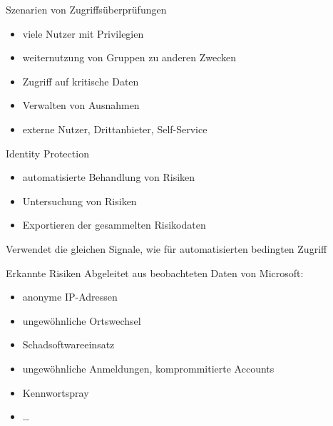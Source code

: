 \begin{flashcard}[Definition]{Szenarien von Zugriffsüberprüfungen}
  \begin{itemize}
    \item viele Nutzer mit Privilegien
    \item weiternutzung von Gruppen zu anderen Zwecken
    \item Zugriff auf kritische Daten
    \item Verwalten von Ausnahmen
    \item externe Nutzer, Drittanbieter, Self-Service
  \end{itemize}
\end{flashcard}

\begin{flashcard}[Definition]{Identity Protection}
  \begin{itemize}
    \item automatisierte Behandlung von Risiken
    \item Untersuchung von Risiken
    \item Exportieren der gesammelten Risikodaten
  \end{itemize}
  Verwendet die gleichen Signale, wie für automatisierten bedingten Zugriff
\end{flashcard}

\begin{flashcard}[Definition]{Erkannte Risiken}
  Abgeleitet aus beobachteten Daten von Microsoft:
  \begin{itemize}
    \item anonyme IP-Adressen
    \item ungewöhnliche Ortswechsel
    \item Schadsoftwareeinsatz
    \item ungewöhnliche Anmeldungen, komprommitierte Accounts
    \item Kennwortspray
    \item \ldots
  \end{itemize}
\end{flashcard}

